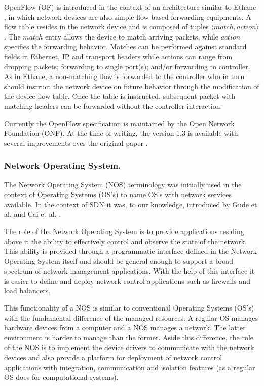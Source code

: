 OpenFlow (OF) is introduced in the context of an architecture similar to
Ethane \cite{Casado:2007kb}, in which network devices 
are also simple flow-based forwarding equipments. A flow
table resides in the network device and is composed of tuples
$\langle match,action \rangle$. The $match$ entry allows the device to match
arriving packets, while  $action$
specifies the forwarding behavior. Matches can be performed against
standard fields in Ethernet, IP and transport headers while actions can
range from dropping packets; forwarding to single port(s); and/or forwarding to controller. As in Ethane, a non-matching flow is forwarded to the controller who in
turn should instruct  the network device on future behavior through
the modification of the device flow table. Once the table is instructed, 
subsequent packet with matching headers can be forwarded without
the controller interaction. 

Currently the OpenFlow specification is maintained by the Open Network
Foundation (ONF). At the time of writing, the version 1.3 \cite{of13} is available with
several improvements over the original paper \cite{openflow}. 

\subsubsection{Network Operating System.} The Network Operating System (NOS) terminology  was initially used in the
context of Operating Systems (OS's) to name OS's with network services available. In the
context of SDN it was, to our knowledge,
introduced by Gude et al. \cite{Gude:2008jd} and
Cai et al. \cite{Z.-Cai:2008fk}. 

The role
of the Network Operating System is to provide
applications residing above it the ability to effectively control and
observe the state of the network. This ability is provided through a
programmatic interface defined in the Network Operating System itself and should be general
enough to support a broad spectrum of  network management
applications. With the help of this interface it is easier to define
and deploy network control applications such as firewalls and load
balancers. 

This functionality of a NOS is similar to conventional  Operating
Systems (OS's) with the fundamental difference of the managed resources. A
regular OS manages hardware devices from a computer 
and  a NOS manages a network.
The latter environment is harder to manage than the former. 
Aside this difference, the role of the NOS is to implement the
device drivers to communicate with the
network devices and also provide a platform for deployment of network
control applications with integration, communication and
isolation features (as a regular OS does for computational systems). 


